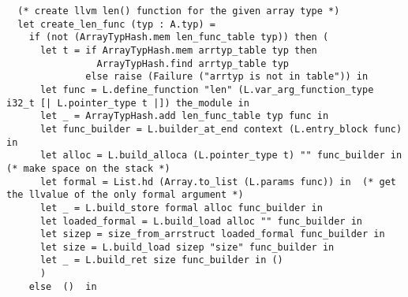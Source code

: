 \documentclass{article}
\begin{document}
\begin{verbatim}
  (* create llvm len() function for the given array type *)
  let create_len_func (typ : A.typ) =
    if (not (ArrayTypHash.mem len_func_table typ)) then (
      let t = if ArrayTypHash.mem arrtyp_table typ then 
                ArrayTypHash.find arrtyp_table typ 
              else raise (Failure ("arrtyp is not in table")) in
      let func = L.define_function "len" (L.var_arg_function_type i32_t [| L.pointer_type t |]) the_module in
      let _ = ArrayTypHash.add len_func_table typ func in
      let func_builder = L.builder_at_end context (L.entry_block func) in
      let alloc = L.build_alloca (L.pointer_type t) "" func_builder in          (* make space on the stack *)
      let formal = List.hd (Array.to_list (L.params func)) in  (* get the llvalue of the only formal argument *)
      let _ = L.build_store formal alloc func_builder in
      let loaded_formal = L.build_load alloc "" func_builder in
      let sizep = size_from_arrstruct loaded_formal func_builder in
      let size = L.build_load sizep "size" func_builder in
      let _ = L.build_ret size func_builder in () 
      )
    else  ()  in  


\end{verbatim}
\end{document}
